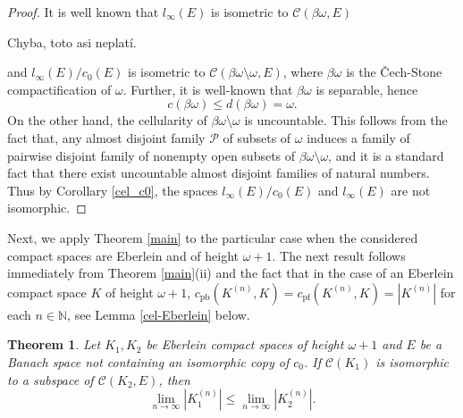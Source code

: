 \documentclass{amsart}
\numberwithin{equation}{section}
\newtheorem{thm}{Theorem}[section]
\theoremstyle{definition}
\def\C{\mathcal C}
\def\en{\mathbb N}
\newcommand{\abs}[1]{\left| #1  \right|}
\begin{document}
\begin{proof}
It is well known that $l_{\infty}(E)$ is isometric to $\C(\beta \omega, E)$

Chyba, toto asi neplatí.

and $l_{\infty}(E)/c_0(E)$ is isometric to $\C(\beta \omega \setminus \omega, E)$, where $\beta \omega$ is the Čech-Stone compactification of $\omega$. Further, it is well-known that $\beta \omega$ is separable, hence 
\[c(\beta \omega) \leq d(\beta \omega)=\omega.\]
On the other hand, the cellularity of $\beta \omega \setminus \omega$ is uncountable. This follows from the fact that, any almost disjoint family $\mathcal{P}$ of subsets of $\omega$ induces a family of pairwise disjoint family of nonempty open subsets of $\beta \omega \setminus \omega$, and it is a standard fact that there exist uncountable almost disjoint families of natural numbers. Thus by Corollary \ref{cel_c0}, the spaces $l_{\infty}(E)/c_0(E)$ and $l_{\infty}(E)$ are not isomorphic. 
\end{proof}

\fi

Next, we apply Theorem \ref{main} to the particular case when the considered compact spaces are Eberlein and of height $\omega+1$. The next result follows immediately from Theorem \ref{main}(ii) and the fact that in the case of an Eberlein compact space $K$ of height $\omega+1$, $c_{\text{pb}}(K^{(n)}, K)=c_{\text{pf}}(K^{(n)}, K)=\abs{K^{(n)}}$ for each $n \in \en$, see Lemma \ref{cel-Eberlein} below.

\begin{thm}
\label{main-Eberlein}
Let $K_1, K_2$ be Eberlein compact spaces of height $\omega+1$ and $E$ be a Banach space not containing an isomorphic copy of $c_0$. If $\C(K_1)$ is isomorphic to a subspace of $\C(K_2, E)$, then  
    \[ \lim_{n \rightarrow \infty} \abs{K_1^{(n)}} \leq \lim_{n \rightarrow \infty} \abs{K_2^{(n)}}.\]
\end{thm}
\end{document}

